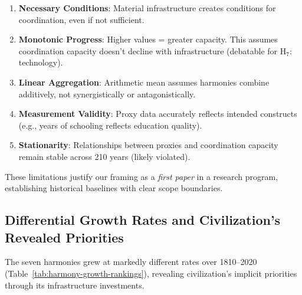 \documentclass[11pt]{article}
\begin{document}
\begin{enumerate}
\item \textbf{Necessary Conditions}: Material infrastructure creates conditions
for coordination, even if not sufficient.

\item \textbf{Monotonic Progress}: Higher values = greater capacity. This
assumes coordination capacity doesn't decline with infrastructure (debatable
for H$_7$: technology).

\item \textbf{Linear Aggregation}: Arithmetic mean assumes harmonies combine
additively, not synergistically or antagonistically.

\item \textbf{Measurement Validity}: Proxy data accurately reflects intended
constructs (e.g., years of schooling reflects education quality).

\item \textbf{Stationarity}: Relationships between proxies and coordination
capacity remain stable across 210 years (likely violated).
\end{enumerate}

These limitations justify our framing as a \textit{first paper} in a research
program, establishing historical baselines with clear scope boundaries.


\subsection{Differential Growth Rates and Civilization's Revealed Priorities}
\label{sec:differential-growth}

The seven harmonies grew at markedly different rates over 1810--2020
(Table~\ref{tab:harmony-growth-rankings}), revealing civilization's implicit
priorities through its infrastructure investments.
\end{document}

